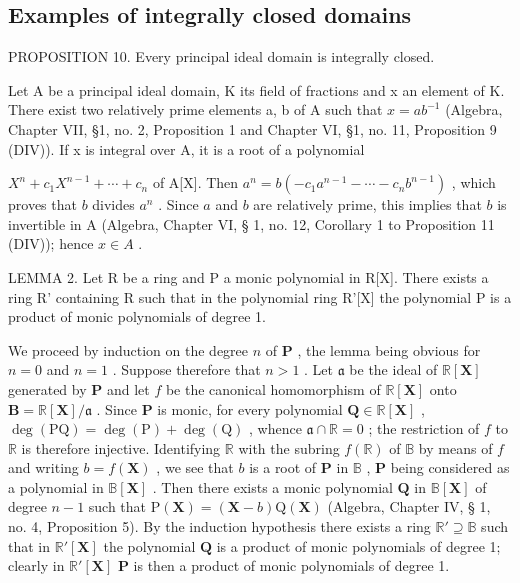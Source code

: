 \subsection{Examples of integrally closed domains}

PROPOSITION 10. Every principal ideal domain is integrally closed.\par

Let A be a principal ideal domain, K its field of fractions and x an element of K. There exist two relatively prime elements a, b of A such that \(x = ab^{-1}\) (Algebra, Chapter VII, §1, no. 2, Proposition 1 and Chapter VI, §1, no. 11, Proposition 9 (DIV)). If x is integral over A, it is a root of a polynomial

\(X^{n} + c_{1}X^{n-1} + \cdots + c_{n}\) of A{[}X{]}. Then \(a^{n} = b(-c_{1}a^{n-1} - \cdots - c_{n}b^{n-1})\) , which proves that \(b\) divides \(a^{n}\) . Since \(a\) and \(b\) are relatively prime, this implies that \(b\) is invertible in A (Algebra, Chapter VI, § 1, no. 12, Corollary 1 to Proposition 11 (DIV)); hence \(x \in A\) .

LEMMA 2. Let R be a ring and P a monic polynomial in R{[}X{]}. There exists a ring R' containing R such that in the polynomial ring R'{[}X{]} the polynomial P is a product of monic polynomials of degree 1.

We proceed by induction on the degree \(n\) of \(\mathbf{P}\) , the lemma being obvious for \(n = 0\) and \(n = 1\) . Suppose therefore that \(n > 1\) . Let \(\mathfrak{a}\) be the ideal of \(\mathbb{R}[\mathbf{X}]\) generated by \(\mathbf{P}\) and let \(f\) be the canonical homomorphism of \(\mathbb{R}[\mathbf{X}]\) onto \(\mathbf{B} = \mathbb{R}[\mathbf{X}] / \mathfrak{a}\) . Since \(\mathbf{P}\) is monic, for every polynomial \(\mathbf{Q} \in \mathbb{R}[\mathbf{X}]\) , \(\deg(\mathrm{PQ}) = \deg(\mathrm{P}) + \deg(\mathrm{Q})\) , whence \(\mathfrak{a} \cap \mathbb{R} = 0\) ; the restriction of \(f\) to \(\mathbb{R}\) is therefore injective. Identifying \(\mathbb{R}\) with the subring \(f(\mathbb{R})\) of \(\mathbb{B}\) by means of \(f\) and writing \(b = f(\mathbf{X})\) , we see that \(b\) is a root of \(\mathbf{P}\) in \(\mathbb{B}\) , \(\mathbf{P}\) being considered as a polynomial in \(\mathbb{B}[\mathbf{X}]\) . Then there exists a monic polynomial \(\mathbf{Q}\) in \(\mathbb{B}[\mathbf{X}]\) of degree \(n - 1\) such that \(\mathrm{P}(\mathbf{X}) = (\mathbf{X} - b)\mathrm{Q}(\mathbf{X})\) (Algebra, Chapter IV, § 1, no. 4, Proposition 5). By the induction hypothesis there exists a ring \(\mathbb{R}' \supseteq \mathbb{B}\) such that in \(\mathbb{R}'[\mathbf{X}]\) the polynomial \(\mathbf{Q}\) is a product of monic polynomials of degree 1; clearly in \(\mathbb{R}'[\mathbf{X}]\) \(\mathbf{P}\) is then a product of monic polynomials of degree 1.

